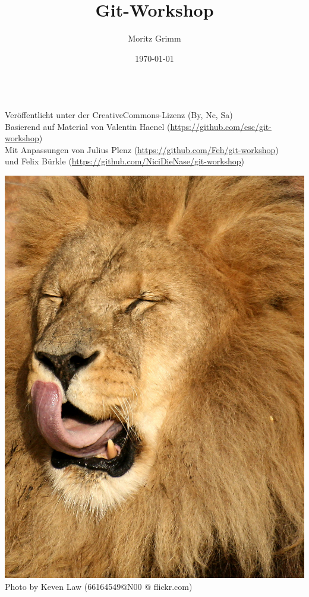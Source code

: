 \documentclass{beamer}
\date{\today}
\begin{document}

\begin{frame}
		\title{Git-Workshop}
		\author{Moritz Grimm}
		\date{}
		\titlepage
		\begin{center}
			\\
			\vspace{0.4cm}
			\tiny{Veröffentlicht unter der CreativeCommons-Lizenz (By, Nc, Sa)}\\
			\vspace{0.2cm}
			\tiny{Basierend auf Material von Valentin Haenel (\url{https://github.com/esc/git-workshop})}\\
			\vspace{0.2cm}
			\tiny{Mit Anpassungen von Julius Plenz (\url{https://github.com/Feh/git-workshop})}\\
			\vspace{0.2cm}
			\tiny{und Felix Bürkle (\url{https://github.com/NiciDieNase/git-workshop})}
		\end{center}
\end{frame}
\begin{frame}
	\includegraphics[height=\textheight]{bilder/yawning_lion.jpg}
	Photo by Keven Law
	(66164549@N00 @ flickr.com)
\end{frame}
\end{document}
